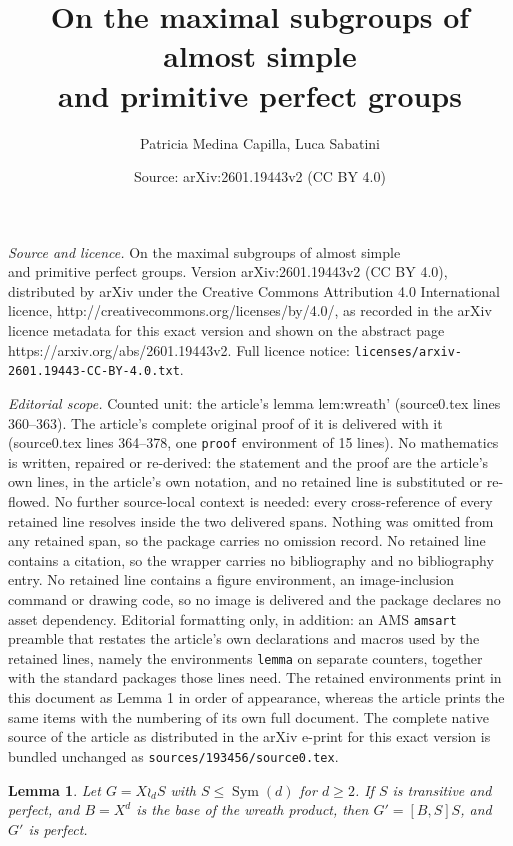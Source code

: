 \documentclass[10pt,a4paper]{amsart}
\title{On the maximal subgroups of almost simple\\and primitive perfect groups}
\author{Patricia Medina Capilla, Luca Sabatini}
\date{Source: arXiv:2601.19443v2 (CC BY 4.0)}
\newtheorem{lemma}{Lemma}
\newcommand{\Sym}{\mathop{\mathrm{Sym}}}
\begin{document}
\maketitle

\noindent\emph{Source and licence.} On the maximal subgroups of almost simple\\and primitive perfect groups. Version arXiv:2601.19443v2 (CC BY 4.0), distributed by arXiv under the Creative Commons Attribution 4.0 International licence, http://creativecommons.org/licenses/by/4.0/, as recorded in the arXiv licence metadata for this exact version and shown on the abstract page https://arxiv.org/abs/2601.19443v2. Full licence notice: \texttt{licenses/arxiv-2601.19443-CC-BY-4.0.txt}.\par\smallskip

\noindent\textit{Editorial scope.} Counted unit: the article's lemma lem:wreath' (source0.tex lines 360--363). The article's complete original proof of it is delivered with it (source0.tex lines 364--378, one \texttt{proof} environment of 15 lines). No mathematics is written, repaired or re-derived: the statement and the proof are the article's own lines, in the article's own notation, and no retained line is substituted or re-flowed.  No further source-local context is needed: every cross-reference of every retained line resolves inside the two delivered spans.  Nothing was omitted from any retained span, so the package carries no omission record.  No retained line contains a citation, so the wrapper carries no bibliography and no bibliography entry.  No retained line contains a figure environment, an image-inclusion command or drawing code, so no image is delivered and the package declares no asset dependency.  Editorial formatting only, in addition: an AMS \texttt{amsart} preamble that restates the article's own declarations and macros used by the retained lines, namely the environments \texttt{lemma} on separate counters, together with the standard packages those lines need.  The retained environments print in this document as Lemma 1 in order of appearance, whereas the article prints the same items with the numbering of its own full document.  The complete native source of the article as distributed in the arXiv e-print for this exact version is bundled unchanged as \texttt{sources/193456/source0.tex}.
\begin{lemma} \label{lem:wreath'}
Let $G = X \wr_d S$ with $S \leqslant \Sym(d)$ for $d \geq 2$.
If $S$ is transitive and perfect, and $B=X^d$ is the base of the wreath product, then $G' = [B,S]S$, and $G'$ is perfect.
\end{lemma}
\end{document}
